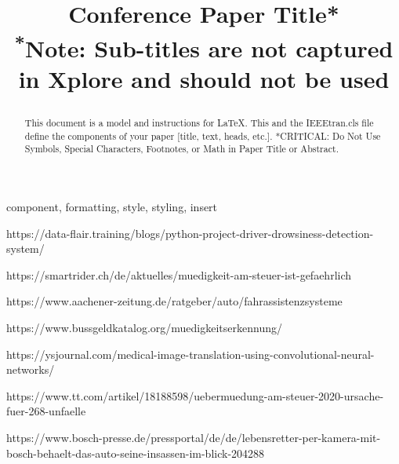 \documentclass[conference]{IEEEtran}
\begin{document}
\lstset{frame=lines}
\lstset{basicstyle=\footnotesize}


\title{Conference Paper Title*\\
{\footnotesize \textsuperscript{*}Note: Sub-titles are not captured in Xplore and
should not be used}

}

\author{
}

\maketitle

\begin{abstract}
This document is a model and instructions for \LaTeX.
This and the IEEEtran.cls file define the components of your paper [title, text, heads, etc.]. *CRITICAL: Do Not Use Symbols, Special Characters, Footnotes, 
or Math in Paper Title or Abstract.
\end{abstract}

\begin{IEEEkeywords}
component, formatting, style, styling, insert
\end{IEEEkeywords}








\newpage




\begin{thebibliography}{00}

 https://data-flair.training/blogs/python-project-driver-drowsiness-detection-system/

 https://smartrider.ch/de/aktuelles/muedigkeit-am-steuer-ist-gefaehrlich

 https://www.aachener-zeitung.de/ratgeber/auto/fahrassistenzsysteme

 https://www.bussgeldkatalog.org/muedigkeitserkennung/

 https://ysjournal.com/medical-image-translation-using-convolutional-neural-networks/

 https://www.tt.com/artikel/18188598/uebermuedung-am-steuer-2020-ursache-fuer-268-unfaelle

 https://www.bosch-presse.de/pressportal/de/de/lebensretter-per-kamera-mit-bosch-behaelt-das-auto-seine-insassen-im-blick-204288


\end{thebibliography}
\vspace{12pt}
\end{document}
